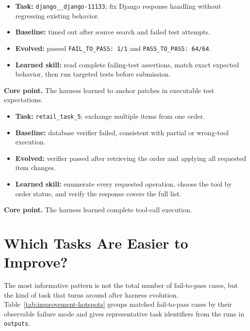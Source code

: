 \begin{tcolorbox}[evoCase, colback=green!2, colframe=green!45,
title={SWE-bench: test-grounded repair}]
\small
\begin{itemize}[leftmargin=1.1em, itemsep=1pt, topsep=1pt]
\item \textbf{Task:} \texttt{django\_\_django-11133}; fix Django response
handling without regressing existing behavior.
\item \textbf{Baseline:} timed out after source search and failed test attempts.
\item \textbf{Evolved:} passed \texttt{FAIL\_TO\_PASS: 1/1} and
\texttt{PASS\_TO\_PASS: 64/64}.
\item \textbf{Learned skill:} read complete failing-test assertions, match
exact expected behavior, then run targeted tests before submission.
\end{itemize}
\tcblower
\textbf{Core point.} The harness learned to anchor patches in executable test
expectations.
\end{tcolorbox}

\begin{tcolorbox}[evoCase, colback=purple!2, colframe=purple!45,
title={TAU-Bench: complete tool execution}]
\small
\begin{itemize}[leftmargin=1.1em, itemsep=1pt, topsep=1pt]
\item \textbf{Task:} \texttt{retail\_task\_5}; exchange multiple items from one
order.
\item \textbf{Baseline:} database verifier failed, consistent with partial or
wrong-tool execution.
\item \textbf{Evolved:} verifier passed after retrieving the order and applying
all requested item changes.
\item \textbf{Learned skill:} enumerate every requested operation, choose the
tool by order status, and verify the response covers the full list.
\end{itemize}
\tcblower
\textbf{Core point.} The harness learned complete tool-call execution.
\end{tcolorbox}

\section{Which Tasks Are Easier to Improve?}\label{app:improvement-hotspots}

The most informative pattern is not the total number of fail-to-pass cases, but
the kind of task that turns around after harness evolution.
Table~\ref{tab:improvement-hotspots} groups matched fail-to-pass cases by their
observable failure mode and gives representative task identifiers from the
runs in \texttt{outputs}.

